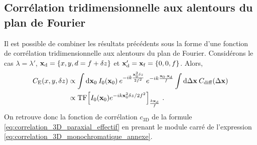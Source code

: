 \subsection{Corrélation tridimensionnelle aux alentours du plan de Fourier}
Il est possible de combiner les résultats précédents sous la forme d'une fonction de corrélation tridimensionnelle aux alentours du plan de Fourier. Considérons le cas $\lambda=\lambda'$, $\mathbf{x}_{\mathrm{d}}=\lbrace x,y,d=f+\delta z\rbrace$ et $\mathbf{x}_{\mathrm{d}}'=\mathbf{x}_{\mathrm{f}}=\lbrace 0,0,f \rbrace$. Alors, 
\begin{align}
C_{\mathrm{E}}(x,y,\delta z)&\propto \int{\mathop{}\mathopen{}\mathrm{d}\mathbf{x}_0\: I_0(\mathbf{x}_0) \: e^{-ik \frac{\mathbf{x}_0^2 \delta z}{2 f^2}} \: e^{-ik \frac{\mathbf{x}_0.\mathbf{x}_{\mathrm{d}}}{f}}} \int{\mathop{}\mathopen{}\mathrm{d}\Delta\mathbf{x}\: C_{\mathrm{diff}}(\Delta\mathbf{x})}\\
&\propto \mathrm{TF}{\left[ I_0(\mathbf{x}_0) e^{-ik\mathbf{x}_0^2 \delta z/2f^2} \right]}_{\frac{k\mathbf{x}_{\mathrm{d}}}{f}} \text{ .}
\label{eq:correlation_3D_monochromatique_annexe}
\end{align}
On retrouve donc la fonction de corrélation $c_{\mathrm{3D}}$ de la formule \ref{eq:correlation_3D_paraxial_effectif} en prenant le module carré de l'expression \ref{eq:correlation_3D_monochromatique_annexe}.












